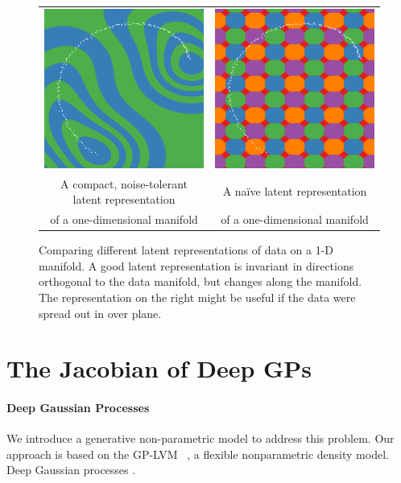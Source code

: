 \documentclass{article}
\begin{document}
\begin{figure}
\centering
\begin{tabular}{cc}
\includegraphics[width=0.45\columnwidth]{figures/hidden_good} &
\includegraphics[width=0.45\columnwidth]{figures/hidden_bad} \\
A compact, noise-tolerant latent representation & A na\"{i}ve latent representation \\
of a one-dimensional manifold & of a one-dimensional manifold
\end{tabular}
\caption{Comparing different latent representations of data on a 1-D manifold.  A good latent representation is invariant in directions orthogonal to the data manifold, but changes along the manifold.  The representation on the right might be useful if the data were spread out in over plane.}
\label{fig:hidden}
\end{figure}

\section{The Jacobian of Deep GPs}

\paragraph{Deep Gaussian Processes}
We introduce a generative non-parametric model to address this problem.  Our approach is based on the GP-LVM ~\cite{lawrence2004gaussian,salzmann2008local,lawrence2009non}, a flexible nonparametric density model.  Deep Gaussian processes \cite{damianou2012deep}.
\end{document}

